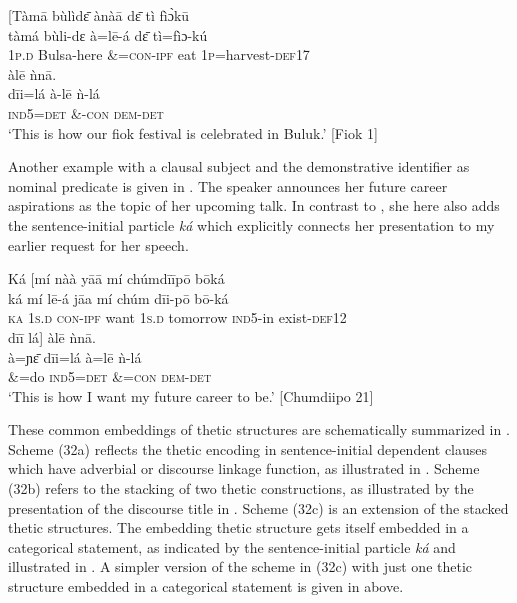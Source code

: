 \documentclass[output=paper]{langsci/langscibook}
\begin{document}
\ea\label{ex:schwarz:30}
\glll   \textup{[}Tàm\={a}  bùlìd\={ɛ}    ànà\={a}    d\=ɛ  {tì   fì\`{ɔ}k\={u}}\\
     \textup{tàmá}  bùli-dɛ    à=l\={e}-á    d\=ɛ  {tì=fìɔ}\textup{-kú}\\
       1\textsc{p}.\textsc{d}  Bulsa-here      \&=\textsc{con}-\textsc{ipf}    eat  1\textsc{p}=harvest-\textsc{def}17  \\
\glll   {d\={i}\={i}  lá\textup{] }} àl\={e}    ǹn\={a}.\\
    \textup{d\={i}i=lá}    à-l\={e}    {ǹ-lá}\\
     \textsc{ind5=det}     \&-\textsc{con}    \textsc{dem-det}\\
\glt ‘This is how our fiok festival is celebrated in Buluk.’ [Fiok 1]
\z

Another example with a clausal subject and the demonstrative identifier as nominal predicate is given in . The speaker announces her future career aspirations as the topic of her upcoming talk. In contrast to , she here also adds the sentence-initial particle \textit{ká} which explicitly connects her presentation to my earlier request for her speech.

\ea\label{ex:schwarz:31}
\glll   Ká  \textup{[}mí    nàà    y\={a}\={a}    mí    chúmd\={i}\={i}p\={o}   { }         b\={o}ká\\
    \textup{ká}   mí    l\={e}-á      j\={a}a    mí    {chúm}        {d\={i}i-p\={o}}    {b\={o}-ká}\\
     \textsc{  ka}   1\textsc{s.d}  \textsc{con-ipf}    want  1\textsc{s}.\textsc{d } {tomorrow}     \textsc{ind}5-in     exist-\textsc{def}12\\
    {d\={i}\={i}   lá{]}} àl\={e}    \`{n}n\={a}. \\
    {à=ɲ\={ɛ}}  d\={i}i=lá    à=l\={e}    {ǹ-lá}\\
       \&=do  \textsc{ind}\textsc{5=}\textsc{det}  \&=\textsc{con}\textsc{ } \textsc{dem-det}\\
\glt ‘This is how I want my future career to be.’ [Chumdiipo 21] \\
\z

These common embeddings of thetic structures are schematically summarized in . Scheme (32a) reflects the thetic encoding in sentence-initial dependent clauses which have adverbial or discourse linkage function, as illustrated in . Scheme (32b) refers to the stacking of two thetic constructions, as illustrated by the presentation of the discourse title in . Scheme (32c) is an extension of the stacked thetic structures. The embedding thetic structure gets itself embedded in a categorical statement, as indicated by the sentence-initial particle \textit{ká} and illustrated in . A simpler version of the scheme in (32c) with just one thetic structure embedded in a categorical statement is given in  above. 
\end{document}
